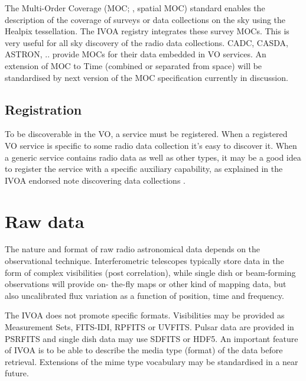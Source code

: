 \documentclass[11pt,a4paper]{ivoa}
\begin{document}
The Multi-Order Coverage (MOC; \cite{2019ivoa.spec.1007F}, spatial MOC) standard enables the description 
of the coverage of surveys or data collections on the sky using the Healpix tessellation. The IVOA 
registry integrates these survey MOCs. This is very useful for all sky discovery of the radio data 
collections. CADC, CASDA, ASTRON, .. provide MOCs for their data embedded in VO services. An extension 
of MOC to Time (combined or separated from space) will be standardised by next version of the MOC 
specification currently in discussion.

\subsection{Registration} 
To be discoverable in the VO, a service must be registered. When a registered VO service is specific to 
some radio data collection it's easy to discover it. When a generic service contains radio data as well 
as other types, it may be a good idea to register the service with a specific auxiliary capability, as 
explained in the IVOA endorsed note discovering data collections \citep{2019ivoa.rept.0520D}.

\section{Raw data}
The nature and format of raw radio astronomical data 
depends on the observational technique. Interferometric telescopes typically store data in the form of 
complex visibilities (post correlation), while single dish or beam-forming observations will provide on-
the-fly maps or other kind of mapping data, but also uncalibrated flux variation as a function of 
position, time and frequency. 

The IVOA does not promote specific formats. Visibilities may be provided as Measurement Sets, FITS-IDI, 
RPFITS or UVFITS. Pulsar data are provided in PSRFITS and single dish data may use SDFITS or HDF5. An 
important feature of IVOA is to be able to describe the media type (format) of the data before 
retrieval. Extensions of the mime type vocabulary may be standardised in a near future.  
\end{document}
